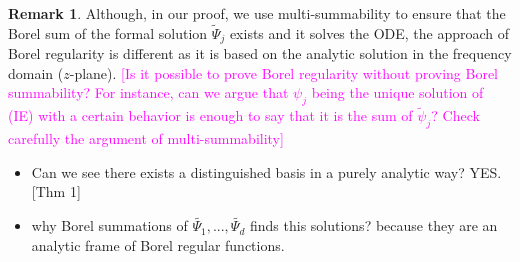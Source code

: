 \documentclass{article}
\theoremstyle{definition}
\newcommand{\series}[1]{\tilde{#1}}
\newtheorem{remark}[definition]{Remark}
\begin{document}
\begin{remark}
Although, in our proof, we use multi-summability to ensure that the Borel sum of the formal solution $\series{\Psi}_j$ exists and it solves the ODE, the approach of Borel regularity is different as it is based on the analytic solution in the frequency domain ($z$-plane). \textcolor{magenta}{[Is it possible to prove Borel regularity without proving Borel summability? For instance, can we argue that $\psi_j$ being the unique solution of (IE) with a certain behavior is enough to say that it is the sum of $\series{\psi}_j$? Check carefully the argument of multi-summability]} 
\end{remark}

\color{gray}
\begin{itemize}
\item Can we see there exists a distinguished basis in a purely analytic way? YES. [Thm 1]%
\item why Borel summations of $\tilde{\Psi_1},...,\tilde{\Psi_d}$ finds this solutions? because they are an analytic frame of Borel regular functions. 
\end{itemize}
\end{document}
